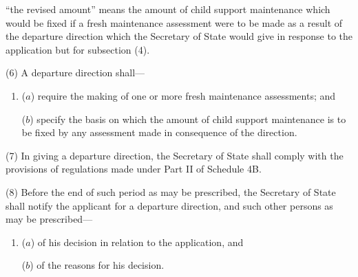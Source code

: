 \documentclass[a4paper]{article}
\begin{document}
{\begin{enumerate}
“the revised amount” means the amount of child support maintenance which would be fixed if a fresh maintenance assessment were to be made as a result of the departure direction which the Secretary of State would give in response to the application but for subsection (4).
\end{enumerate}

(6) A departure direction shall—
\begin{enumerate}\item[]
($a$) require 
the making of
one or more fresh maintenance assessments; and

($b$) specify the basis on which the amount of child support maintenance is to be fixed by any assessment made in consequence of the direction.
\end{enumerate}

(7) In giving a departure direction, the Secretary of State shall comply with the provisions of regulations made under Part II of Schedule 4B.

(8) Before the end of such period as may be prescribed, the Secretary of State shall notify the applicant for a departure direction, and such other persons as may be prescribed—
\begin{enumerate}\item[]
($a$) of his decision in relation to the application, and

($b$) of the reasons for his decision.
\end{enumerate}

}
\end{document}

